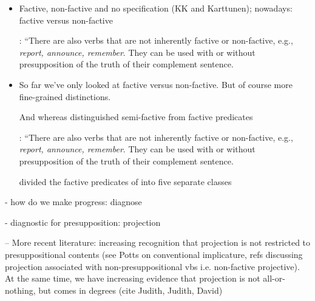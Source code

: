 \documentclass[11pt,fleqn]{article}
\newcommand{\6}{\mbox{$[\hspace*{-.6mm}[$}}
\newcommand{\9}{\mbox{$]\hspace*{-.6mm}]$}}
\begin{document}
\begin{itemize}

\item Factive, non-factive and no specification (KK and Karttunen); nowadays: factive versus non-factive

\citealt[340]{karttunen71-implicative}: ``There are also verbs that are not inherently factive or non-factive, e.g., {\em report, announce, remember}. They can be used with or without presupposition of the truth of their complement sentence.



%






\newpage

\item So far we've only looked at factive versus non-factive. But of course more fine-grained distinctions.

And whereas \citet{karttunen71b}  distinguished  semi-factive from factive predicates

\citealt[340]{karttunen71-implicative}: ``There are also verbs that are not inherently factive or non-factive, e.g., {\em report, announce, remember}. They can be used with or without presupposition of the truth of their complement sentence.

\citet{karttunen2016} divided the factive  predicates of \citealt{kiparsky-kiparsky70} into five separate classes

\end{itemize}

- how do we make progress: diagnose

- diagnostic for presupposition: projection

-- More recent literature: increasing recognition that projection is not restricted to presuppositional contents (see Potts on conventional implicature, refs discussing projection associated with non-presuppositional vbs i.e. non-factive projective). At the same time, we have increasing evidence that projection is not all-or-nothing, but comes in degrees (cite Judith, Judith, David)
\end{document}
